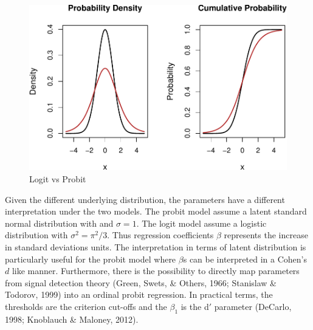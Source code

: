 \documentclass[
  man,floatsintext]{apa6}
\begin{document}
\begin{figure}

{\centering \includegraphics{paper-new_files/figure-latex/logit-vs-probit-1} 

}

\caption{Logit vs Probit}\label{fig:logit-vs-probit}
\end{figure}

Given the different underlying distribution, the parameters have a different interpretation under the two models. The probit model assume a latent standard normal distribution with and \(\sigma = 1\). The logit model assume a logistic distribution with \(\sigma^2 = \pi^2/3\). Thus regression coefficients \(\beta\) represents the increase in standard deviations units. The interpretation in terms of latent distribution is particularly useful for the probit model where \(\beta\)s can be interpreted in a Cohen's \(d\) like manner. Furthermore, there is the possibility to directly map parameters from signal detection theory (Green, Swets, \& Others, 1966; Stanislaw \& Todorov, 1999) into an ordinal probit regression. In practical terms, the thresholds are the criterion cut-offs and the \(\beta_1\) is the d\('\) parameter (DeCarlo, 1998; Knoblauch \& Maloney, 2012).
\end{document}
